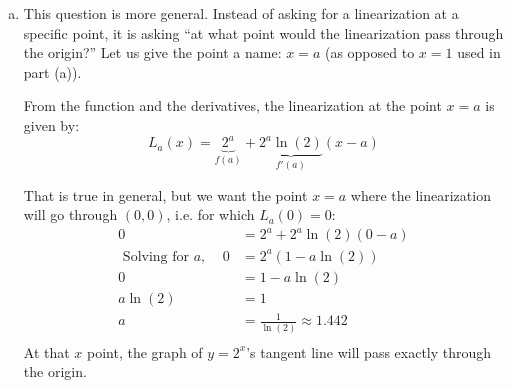 \begin{enumerate}[1.]
\begin{multicols}{2}
\begin{Solution}
\begin{enumerate}[(a)]
\item This question is more general.  Instead of asking for a
  linearization at a specific point, it is asking ``at what point
  would the linearization pass through the origin?''  Let us give the
  point a name: $x=a$ (as opposed to $x=1$ used in part (a)).

From the function and the derivatives, the linearization at the point $x=a$ is given by:
$$L_a(x) = \underbrace{2^a}_{f(a)} + \underbrace{2^a \ln(2)}_{f'(a)}(x-a)$$

That is true in general, but we want the point $x=a$ where the
linearization will go through $(0,0)$, i.e. for which $L_a(0) = 0$:
\begin{align*}
0 & = 2^a + 2^a \ln(2) (0-a)  \\
\mbox{ Solving for }a,~~~~~ 0 & = 2^a (1 - a \ln(2)) \\
0 & = 1 - a \ln(2) \\
a \ln(2)  & = 1  \\
a & = \frac{1}{\ln(2)} \approx 1.442  \\
\end{align*}
At that $x$ point, the graph of $y = 2^x$'s tangent line will pass
exactly through the origin.
    \end{enumerate}
  \end{Solution}


\end{multicols}
\end{enumerate}
